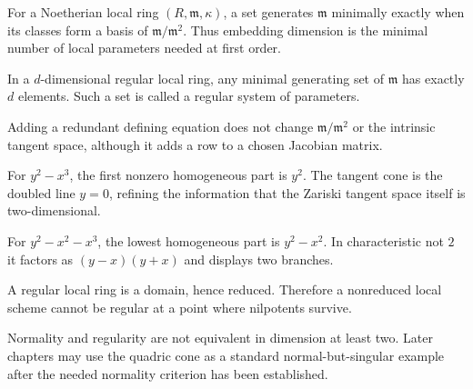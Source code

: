 \begin{example}\label{ex:vi32-adv-01}
For a Noetherian local ring $(R,\mathfrak m,\kappa)$, a set generates $\mathfrak m$ minimally exactly when its classes form a basis of $\mathfrak m/\mathfrak m^2$. Thus embedding dimension is the minimal number of local parameters needed at first order.
\end{example}

\begin{example}\label{ex:vi32-adv-02}
In a $d$-dimensional regular local ring, any minimal generating set of $\mathfrak m$ has exactly $d$ elements. Such a set is called a regular system of parameters.
\end{example}

\begin{example}\label{ex:vi32-adv-03}
Adding a redundant defining equation does not change $\mathfrak m/\mathfrak m^2$ or the intrinsic tangent space, although it adds a row to a chosen Jacobian matrix.
\end{example}

\begin{example}\label{ex:vi32-adv-04}
For $y^2-x^3$, the first nonzero homogeneous part is $y^2$. The tangent cone is the doubled line $y=0$, refining the information that the Zariski tangent space itself is two-dimensional.
\end{example}

\begin{example}\label{ex:vi32-adv-05}
For $y^2-x^2-x^3$, the lowest homogeneous part is $y^2-x^2$. In characteristic not $2$ it factors as $(y-x)(y+x)$ and displays two branches.
\end{example}

\begin{example}\label{ex:vi32-adv-06}
A regular local ring is a domain, hence reduced. Therefore a nonreduced local scheme cannot be regular at a point where nilpotents survive.
\end{example}

\begin{example}\label{ex:vi32-adv-07}
Normality and regularity are not equivalent in dimension at least two. Later chapters may use the quadric cone as a standard normal-but-singular example after the needed normality criterion has been established.
\end{example}

